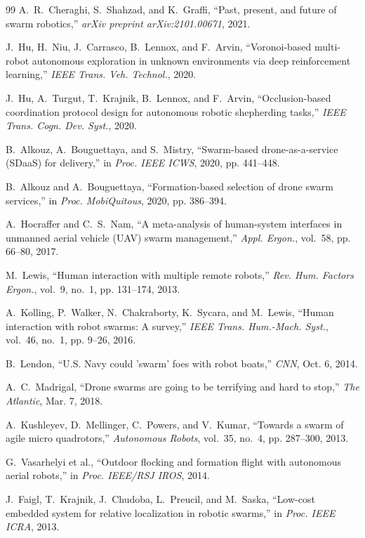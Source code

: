 \documentclass[letterpaper, 10pt, conference]{IEEEtran}
\begin{document}
\begin{thebibliography}{99}
A.~R.~Cheraghi, S.~Shahzad, and K.~Graffi, ``Past, present, and future of swarm robotics,'' \emph{arXiv preprint arXiv:2101.00671}, 2021.

J.~Hu, H.~Niu, J.~Carrasco, B.~Lennox, and F.~Arvin, ``Voronoi-based multi-robot autonomous exploration in unknown environments via deep reinforcement learning,'' \emph{IEEE Trans. Veh. Technol.}, 2020.

J.~Hu, A.~Turgut, T.~Krajnik, B.~Lennox, and F.~Arvin, ``Occlusion-based coordination protocol design for autonomous robotic shepherding tasks,'' \emph{IEEE Trans. Cogn. Dev. Syst.}, 2020.

B.~Alkouz, A.~Bouguettaya, and S.~Mistry, ``Swarm-based drone-as-a-service ({SDaaS}) for delivery,'' in \emph{Proc. IEEE ICWS}, 2020, pp. 441--448.

B.~Alkouz and A.~Bouguettaya, ``Formation-based selection of drone swarm services,'' in \emph{Proc. MobiQuitous}, 2020, pp. 386--394.

A.~Hocraffer and C.~S.~Nam, ``A meta-analysis of human-system interfaces in unmanned aerial vehicle ({UAV}) swarm management,'' \emph{Appl. Ergon.}, vol.~58, pp. 66--80, 2017.

M.~Lewis, ``Human interaction with multiple remote robots,'' \emph{Rev. Hum. Factors Ergon.}, vol.~9, no.~1, pp. 131--174, 2013.

A.~Kolling, P.~Walker, N.~Chakraborty, K.~Sycara, and M.~Lewis, ``Human interaction with robot swarms: A survey,'' \emph{IEEE Trans. Hum.-Mach. Syst.}, vol.~46, no.~1, pp. 9--26, 2016.

B.~Lendon, ``{U.S.} Navy could 'swarm' foes with robot boats,'' \emph{CNN}, Oct. 6, 2014.

A.~C.~Madrigal, ``Drone swarms are going to be terrifying and hard to stop,'' \emph{The Atlantic}, Mar. 7, 2018.

A.~Kushleyev, D.~Mellinger, C.~Powers, and V.~Kumar, ``Towards a swarm of agile micro quadrotors,'' \emph{Autonomous Robots}, vol.~35, no.~4, pp. 287--300, 2013.

G.~Vasarhelyi et al., ``Outdoor flocking and formation flight with autonomous aerial robots,'' in \emph{Proc. IEEE/RSJ IROS}, 2014.

J.~Faigl, T.~Krajnik, J.~Chudoba, L.~Preucil, and M.~Saska, ``Low-cost embedded system for relative localization in robotic swarms,'' in \emph{Proc. IEEE ICRA}, 2013.


\end{thebibliography}
\end{document}
